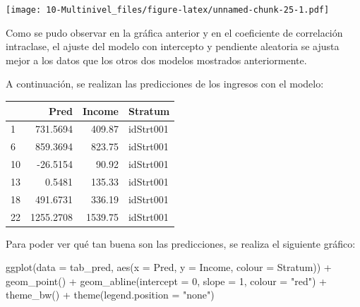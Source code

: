 \documentclass[
  12pt,
]{book}
\newenvironment{Shaded}{\begin{snugshade}}{\end{snugshade}}
\newcommand{\AttributeTok}[1]{\textcolor[rgb]{0.77,0.63,0.00}{#1}}
\newcommand{\CommentTok}[1]{\textcolor[rgb]{0.56,0.35,0.01}{\textit{#1}}}
\newcommand{\DecValTok}[1]{\textcolor[rgb]{0.00,0.00,0.81}{#1}}
\newcommand{\FunctionTok}[1]{\textcolor[rgb]{0.00,0.00,0.00}{#1}}
\newcommand{\NormalTok}[1]{#1}
\newcommand{\OtherTok}[1]{\textcolor[rgb]{0.56,0.35,0.01}{#1}}
\newcommand{\SpecialCharTok}[1]{\textcolor[rgb]{0.00,0.00,0.00}{#1}}
\newcommand{\StringTok}[1]{\textcolor[rgb]{0.31,0.60,0.02}{#1}}
\begin{document}
\texttt{[image: 10-Multinivel\_files/figure-latex/unnamed-chunk-25-1.pdf]}

Como se pudo observar en la gráfica anterior y en el coeficiente de correlación intraclase, el ajuste del modelo con intercepto y pendiente aleatoria se ajusta mejor a los datos que los otros dos modelos mostrados anteriormente.

A continuación, se realizan las predicciones de los ingresos con el modelo:

\begin{Shaded}
\end{Shaded}

\begin{tabular}{l|r|r|l}
\hline
  & Pred & Income & Stratum\\
\hline
1 & 731.5694 & 409.87 & idStrt001\\
\hline
6 & 859.3694 & 823.75 & idStrt001\\
\hline
10 & -26.5154 & 90.92 & idStrt001\\
\hline
13 & 0.5481 & 135.33 & idStrt001\\
\hline
18 & 491.6731 & 336.19 & idStrt001\\
\hline
22 & 1255.2708 & 1539.75 & idStrt001\\
\hline
\end{tabular}

Para poder ver qué tan buena son las predicciones, se realiza el siguiente gráfico:

\begin{Shaded}
\begin{Highlighting}[]
\FunctionTok{ggplot}\NormalTok{(}\AttributeTok{data =}\NormalTok{ tab\_pred, }\FunctionTok{aes}\NormalTok{(}\AttributeTok{x =}\NormalTok{ Pred, }\AttributeTok{y =}\NormalTok{ Income, }\AttributeTok{colour =}\NormalTok{ Stratum)) }\SpecialCharTok{+} 
  \FunctionTok{geom\_point}\NormalTok{() }\SpecialCharTok{+} \FunctionTok{geom\_abline}\NormalTok{(}\AttributeTok{intercept =} \DecValTok{0}\NormalTok{, }\AttributeTok{slope =} \DecValTok{1}\NormalTok{, }\AttributeTok{colour =} \StringTok{"red"}\NormalTok{) }\SpecialCharTok{+}
  \FunctionTok{theme\_bw}\NormalTok{() }\SpecialCharTok{+} \FunctionTok{theme}\NormalTok{(}\AttributeTok{legend.position =} \StringTok{"none"}\NormalTok{) }
\end{Highlighting}
\end{Shaded}
\end{document}
